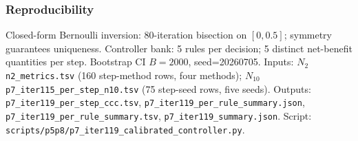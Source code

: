 \subsubsection*{Reproducibility}

Closed-form Bernoulli inversion: $80$-iteration bisection on
$[0, 0.5]$; symmetry guarantees uniqueness.
Controller bank: 5 rules per decision; 5 distinct net-benefit
quantities per step. Bootstrap CI $B=2000$, seed=20260705. Inputs:
$N_2$ \texttt{n2\_metrics.tsv} (160 step-method rows, four methods);
$N_{10}$ \texttt{p7\_iter115\_per\_step\_n10.tsv} (75 step-seed rows,
five seeds). Outputs: \texttt{p7\_iter119\_per\_step\_ccc.tsv},
\texttt{p7\_iter119\_per\_rule\_summary.json},
\texttt{p7\_iter119\_per\_rule\_summary.tsv},
\texttt{p7\_iter119\_summary.json}. Script:
\texttt{scripts/p5p8/p7\_iter119\_calibrated\_controller.py}.

